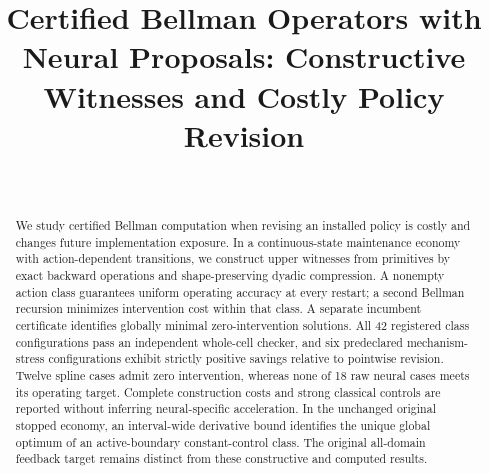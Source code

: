 
\begin{frontmatter}
\title{Certified Bellman Operators with Neural Proposals: Constructive Witnesses and Costly Policy Revision}
\begin{aug}\author[id=au1,addressref={add1}]{~}\address[id=add1]{}\end{aug}
\begin{abstract}We study certified Bellman computation when revising an installed policy is costly and changes future implementation exposure. In a continuous-state maintenance economy with action-dependent transitions, we construct upper witnesses from primitives by exact backward operations and shape-preserving dyadic compression. A nonempty action class guarantees uniform operating accuracy at every restart; a second Bellman recursion minimizes intervention cost within that class. A separate incumbent certificate identifies globally minimal zero-intervention solutions. All 42 registered class configurations pass an independent whole-cell checker, and six predeclared mechanism-stress configurations exhibit strictly positive savings relative to pointwise revision. Twelve spline cases admit zero intervention, whereas none of 18 raw neural cases meets its operating target. Complete construction costs and strong classical controls are reported without inferring neural-specific acceleration. In the unchanged original stopped economy, an interval-wide derivative bound identifies the unique global optimum of an active-boundary constant-control class. The original all-domain feedback target remains distinct from these constructive and computed results.\end{abstract}
\begin{keyword}\end{keyword}
\end{frontmatter}

\clearpage

